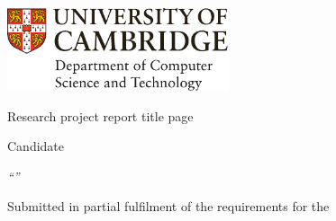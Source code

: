 \ifsubmission

\begin{defaultsffamily}
\begin{titlepage}
\makeatletter

\hspace*{-14mm}\includegraphics[width=65mm]{images/logo-dcst-colour}

\begin{Large}
\vspace{20mm}
Research project report title page

\vspace{35mm}
Candidate \candidatenumber

\vspace{42mm}
\textsl{``\@title''}

\end{Large}

\vspace{\fill}
\begin{center}
Submitted in partial fulfilment of the requirements for the\\
\course
\end{center}

\makeatother
\end{titlepage}
\end{defaultsffamily}
\newpage

\else

